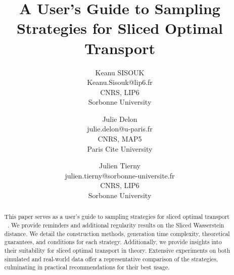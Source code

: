 \documentclass[10pt]{article}
\title{A User's Guide to Sampling Strategies for Sliced Optimal Transport}
\author{Keanu SISOUK \\ Keanu.Sisouk@lip6.fr \\
      CNRS, LIP6\\
      Sorbonne University
      \and
      Julie Delon \\julie.delon@u-paris.fr \\
      CNRS, MAP5\\
      Paris Cite University
      \and
      Julien Tierny \\ julien.tierny@sorbonne-universite.fr\\
      CNRS, LIP6 \\
      Sorbonne University\\
     	}
\date{}
\theoremstyle{theoremstyle}
\begin{document}
\maketitle

\begin{abstract}

This paper serves as a user's guide to sampling strategies for sliced optimal transport ~\cite{Rabin_texture_mixing_sw,bonneel2015sliced}. 
We provide reminders and additional regularity results on the Sliced Wasserstein distance.
We detail the construction methods, generation time complexity, theoretical guarantees, and conditions for each strategy. Additionally, we provide insights into their suitability for sliced optimal transport in theory. Extensive experiments on both simulated and real-world data offer a representative comparison of the strategies, culminating in practical recommendations for their best usage.

\end{abstract}














\end{document}
